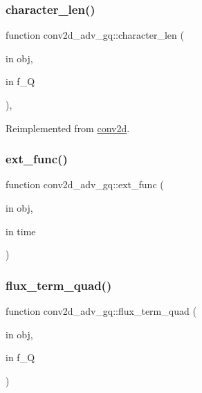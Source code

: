 \subsubsection{\texorpdfstring{character\+\_\+len()}{character\_len()}}
{\footnotesize\ttfamily function conv2d\+\_\+adv\+\_\+gq\+::character\+\_\+len (\begin{DoxyParamCaption}\item[{in}]{obj,  }\item[{in}]{f\+\_\+Q }\end{DoxyParamCaption})\hspace{0.3cm}{\ttfamily [protected]}, {\ttfamily [virtual]}}



Reimplemented from \hyperlink{classconv2d_a2a9302ee21fb44a98550dcae0fa1d855}{conv2d}.

\mbox{\label{classconv2d__adv__gq_a018b65774b743c87bc91b784ff2f97bd}} 
\subsubsection{\texorpdfstring{ext\+\_\+func()}{ext\_func()}}
{\footnotesize\ttfamily function conv2d\+\_\+adv\+\_\+gq\+::ext\+\_\+func (\begin{DoxyParamCaption}\item[{in}]{obj,  }\item[{in}]{time }\end{DoxyParamCaption})\hspace{0.3cm}{\ttfamily [protected]}}

\mbox{\label{classconv2d__adv__gq_a43cb678ecc9412a509e4a24d8f68a85a}} 
\subsubsection{\texorpdfstring{flux\+\_\+term\+\_\+quad()}{flux\_term\_quad()}}
{\footnotesize\ttfamily function conv2d\+\_\+adv\+\_\+gq\+::flux\+\_\+term\+\_\+quad (\begin{DoxyParamCaption}\item[{in}]{obj,  }\item[{in}]{f\+\_\+Q }\end{DoxyParamCaption})\hspace{0.3cm}{\ttfamily [protected]}}

